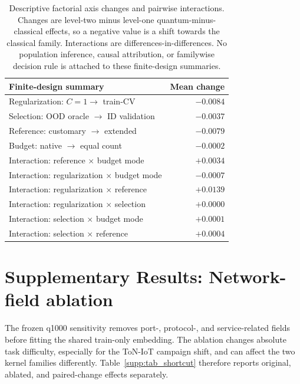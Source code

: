 \documentclass[11pt]{article}
\begin{document}
\begin{table}[htbp]
\centering
\caption{Descriptive factorial axis changes and pairwise interactions.
Changes are level-two minus level-one quantum-minus-classical effects, so a
negative value is a shift towards the classical family. Interactions are
differences-in-differences. No population inference, causal attribution, or
familywise decision rule is attached to these finite-design summaries.}
\label{supp:tab_factorial_contrasts}
\scriptsize
\setlength{\tabcolsep}{5pt}
\begin{tabular}{lr}
\toprule
Finite-design summary & Mean change \\
\midrule
Regularization: $C=1\to$ train-CV & $-0.0084$ \\
Selection: OOD oracle $\to$ ID validation & $-0.0037$ \\
Reference: customary $\to$ extended & $-0.0079$ \\
Budget: native $\to$ equal count & $-0.0002$ \\
\addlinespace
Interaction: reference $\times$ budget mode & $+0.0034$ \\
Interaction: regularization $\times$ budget mode & $-0.0007$ \\
Interaction: regularization $\times$ reference & $+0.0139$ \\
Interaction: regularization $\times$ selection & $+0.0000$ \\
Interaction: selection $\times$ budget mode & $+0.0001$ \\
Interaction: selection $\times$ reference & $+0.0004$ \\
\bottomrule
\end{tabular}
\end{table}

\section*{Supplementary Results: Network-field ablation}
\label{supp:shortcut}

The frozen q1000 sensitivity removes port-, protocol-, and service-related
fields before fitting the shared train-only embedding. The ablation changes
absolute task difficulty, especially for the ToN-IoT campaign shift, and can
affect the two kernel families differently. Table~\ref{supp:tab_shortcut}
therefore reports original, ablated, and paired-change effects separately.
\end{document}
